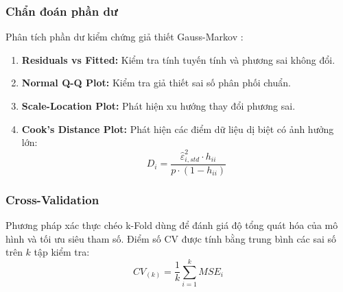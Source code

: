 \documentclass[12pt,a4paper]{article}
\begin{document}
\subsubsection{Chẩn đoán phần dư}
Phân tích phần dư kiểm chứng giả thiết Gauss-Markov \cite{james}:
\begin{enumerate}
    \item \textbf{Residuals vs Fitted:} Kiểm tra tính tuyến tính và phương sai không đổi.
    \item \textbf{Normal Q-Q Plot:} Kiểm tra giả thiết sai số phân phối chuẩn.
    \item \textbf{Scale-Location Plot:} Phát hiện xu hướng thay đổi phương sai.
    \item \textbf{Cook's Distance Plot:} Phát hiện các điểm dữ liệu dị biệt có ảnh hưởng lớn:
    \begin{equation}
        D_i = \frac{\hat{\varepsilon}_{i,std}^2 \cdot h_{ii}}{p \cdot (1 - h_{ii})}
    \end{equation}
\end{enumerate}

\subsubsection{Cross-Validation}
Phương pháp xác thực chéo k-Fold dùng để đánh giá độ tổng quát hóa của mô hình và tối ưu siêu tham số. Điểm số CV được tính bằng trung bình các sai số trên $k$ tập kiểm tra:
\begin{equation}
    CV_{(k)} = \frac{1}{k} \sum_{i=1}^k MSE_i
\end{equation}
\end{document}
